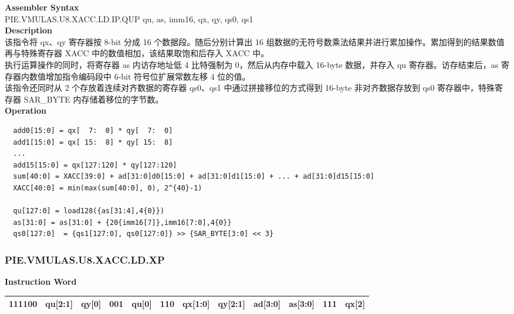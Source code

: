 \textbf{Assembler Syntax} \\
PIE.VMULAS.U8.XACC.LD.IP.QUP qu, as, imm16, qx, qy, qs0, qs1 \\
\textbf{Description} \\
该指令将 qx、qy 寄存器按 8-bit 分成 16 个数据段。随后分别计算出 16 组数据的无符号数乘法结果并进行累加操作。累加得到的结果数值再与特殊寄存器 XACC 中的数值相加，该结果取饱和后存入 XACC 中。\\
执行运算操作的同时，将寄存器 as 内访存地址低 4 比特强制为 0，然后从内存中载入 16-byte 数据，并存入 qu 寄存器。访存结束后，as 寄存器内数值增加指令编码段中 6-bit 符号位扩展常数左移 4 位的值。\\
该指令还同时从 2 个存放着连续对齐数据的寄存器 qs0、qs1 中通过拼接移位的方式得到 16-byte 非对齐数据存放到 qs0 寄存器中，特殊寄存器 SAR\_BYTE 内存储着移位的字节数。\\
\textbf{Operation}
\begin{lstlisting}
  add0[15:0] = qx[  7:  0] * qy[  7:  0]
  add1[15:0] = qx[ 15:  8] * qy[ 15:  8]
  ...
  add15[15:0] = qx[127:120] * qy[127:120]
  sum[40:0] = XACC[39:0] + ad[31:0]d0[15:0] + ad[31:0]d1[15:0] + ... + ad[31:0]d15[15:0]
  XACC[40:0] = min(max(sum[40:0], 0), 2^{40}-1)

  qu[127:0] = load128({as[31:4],4{0}})
  as[31:0] = as[31:0] + {20{imm16[7]},imm16[7:0],4{0}}
  qs0[127:0]  = {qs1[127:0], qs0[127:0]} >> {SAR_BYTE[3:0] << 3}
\end{lstlisting}

\newpage
\subsubsection{PIE.VMULAS.U8.XACC.LD.XP}\label{instruction:PIEVMULASU8XACCLDXP}
\setlength\tabcolsep{6pt}
\textbf{Instruction Word} \\
\begin{tabular}{|c|c|c|c|c|c|c|c|c|c|c|c|}
	\hline
	111100 & qu[2:1] & qy[0] & 001 & qu[0] & 110 & qx[1:0] & qy[2:1] & ad[3:0] & as[3:0] & 111 & qx[2] \\
	\hline
\end{tabular}

